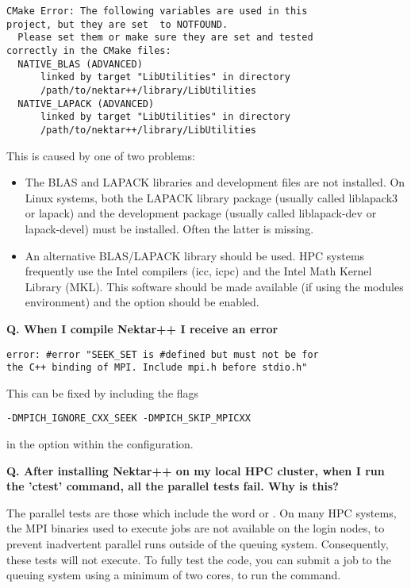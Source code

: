\begin{lstlisting}[style=BashInputStyle]
  CMake Error: The following variables are used in this
project, but they are set  to NOTFOUND.
  Please set them or make sure they are set and tested
correctly in the CMake files:
  NATIVE_BLAS (ADVANCED)
      linked by target "LibUtilities" in directory
      /path/to/nektar++/library/LibUtilities
  NATIVE_LAPACK (ADVANCED)
      linked by target "LibUtilities" in directory
      /path/to/nektar++/library/LibUtilities
\end{lstlisting}

This is caused by one of two problems:
\begin{itemize}
  \item The BLAS and LAPACK libraries and development files are not installed.
  On Linux systems, both the LAPACK library package (usually called liblapack3
  or lapack) and the development package (usually called liblapack-dev or
  lapack-devel) must be installed. Often the latter is missing.
  \item An alternative BLAS/LAPACK library should be used. HPC systems
  frequently use the Intel compilers (icc, icpc) and the Intel Math Kernel
  Library (MKL). This software should be made available (if using the modules
  environment) and the option  should be enabled.
\end{itemize}

\textbf{Q. When I compile Nektar++ I receive an error}
\begin{lstlisting}[style=BashInputStyle]
error: #error "SEEK_SET is #defined but must not be for 
the C++ binding of MPI. Include mpi.h before stdio.h"
\end{lstlisting}

This can be fixed by including the flags
\begin{lstlisting}[style=BashInputStyle]
-DMPICH_IGNORE_CXX_SEEK -DMPICH_SKIP_MPICXX
\end{lstlisting}
in the  option within the  configuration.

\textbf{Q. After installing Nektar++ on my local HPC cluster, when I run the
'ctest' command, all the parallel tests fail. Why is this?}

The parallel tests are those which include the word  or
.
On many HPC systems, the MPI binaries used to execute jobs are not available on the
login nodes, to prevent inadvertent parallel runs outside of the queuing system.
Consequently, these tests will not execute. To fully test the code, you can
submit a job to the queuing system using a minimum of two cores, to run the
 command.

